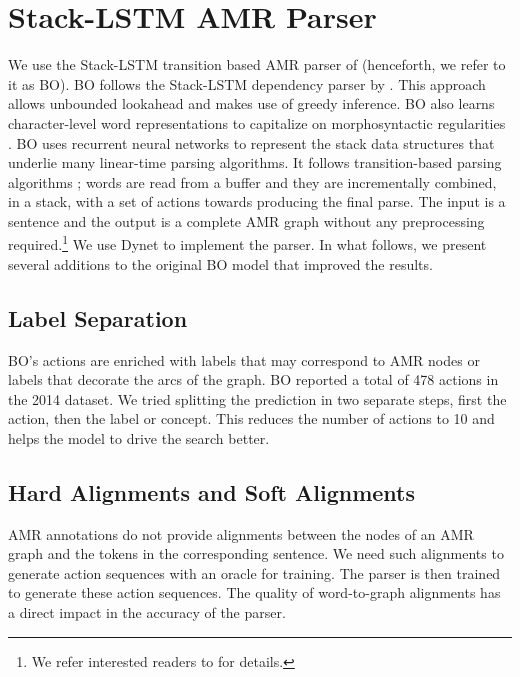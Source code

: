 \documentclass[11pt,a4paper]{article}
\begin{document}
\section{Stack-LSTM AMR Parser}
\vspace{-0.1cm}
We use the Stack-LSTM transition based AMR parser of  (henceforth, we refer to it as BO). BO follows the Stack-LSTM dependency parser by . This approach allows unbounded lookahead and makes use of greedy inference. BO also learns character-level word representations to capitalize on morphosyntactic regularities \cite{ballesteros15}. BO uses recurrent neural networks to represent the stack data structures that underlie many linear-time parsing algorithms. It follows transition-based parsing algorithms \cite{yamada03,nivre03iwpt,nivre08cl}; words are read from a buffer and they are incrementally combined, in a stack, with a set of actions towards producing the final parse. The input is a sentence and the output is a complete AMR graph without any preprocessing required.\footnote{We refer interested readers to \cite{D17-1130} for details.} We use Dynet \cite{dynet} to implement the parser. In what follows, we present several additions to the original BO model that improved the results.

\subsection{Label Separation}
\vspace{-0.1cm}
BO's actions are enriched with labels that may correspond to AMR nodes or labels that decorate the arcs of the graph. BO reported a total of 478 actions in the 2014 dataset. We tried splitting the prediction in two separate steps, first the action, then the label or concept. This reduces the number of actions to 10 and helps the model to drive the search better.

\subsection{Hard Alignments and Soft Alignments}
\vspace{-0.1cm}
AMR annotations do not provide alignments between the nodes of an AMR graph and the tokens in the corresponding sentence. We need such alignments to generate action sequences with an oracle for training. The parser is then trained to generate these action sequences. The quality of word-to-graph alignments has a direct impact in the accuracy of the parser.
\end{document}
